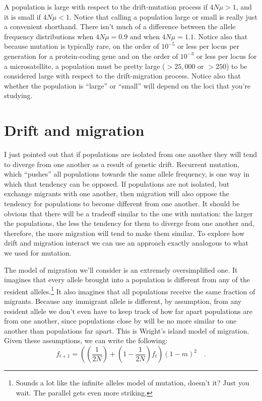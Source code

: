 \documentclass[12pt]{article}
\begin{document}
A population is large with respect to the drift-mutation process if
$4N\mu > 1$, and it is small if $4N\mu < 1$. Notice that calling a
population large or small is really just a convenient shorthand. There
isn't much of a difference between the allele frequency distributions
when $4N\mu = 0.9$ and when $4N\mu = 1.1$. Notice also that because
mutation is typically rare, on the order of $10^{-5}$ or less per
locus per generation for a protein-coding gene and on the order of
$10^{-3}$ or less per locus for a microsatellite, a population must be
pretty large ($> 25,000$ or $>250$) to be considered large with
respect to the drift-migration process. Notice also that whether the
population is ``large'' or ``small'' will depend on the loci that
you're studying.

\section*{Drift and migration}

I just pointed out that if populations are isolated from one another
they will tend to diverge from one another as a result of genetic
drift. Recurrent mutation, which ``pushes'' all populations towards
the same allele frequency, is one way in which that tendency can be
opposed. If populations are not isolated, but exchange migrants with
one another, then migration will also oppose the tendency for
populations to become different from one another. It should be obvious
that there will be a tradeoff similar to the one with mutation: the
larger the populations, the less the tendency for them to diverge from
one another and, therefore, the more migration will tend to make them
similar. To explore how drift and migration interact we can use an
approach exactly analogous to what we used for mutation.

The model of migration we'll consider is an extremely oversimplified
one. It imagines that every allele brought into a population is
different from any of the resident alleles.\footnote{Sounds a lot like
  the infinite alleles model of mutation, doesn't it? Just you
  wait. The parallel gets even more striking.} It also imagines that
all populations receive the same fraction of migrants. Because any
immigrant allele is different, by assumption, from any resident allele
we don't even have to keep track of how far apart populations are from
one another, since populations close by will be no more similar to one
another than populations far apart. This is Wright's island model of
migration. Given these assumptions, we can write the following:
\begin{equation}
f_{t+1} = \left(\left(\frac{1}{2N}\right) +
          \left(1 - \frac{1}{2N}\right)f_t\right)(1-m)^2 \quad
\label{eq:f-m} .
\end{equation}
\end{document}

